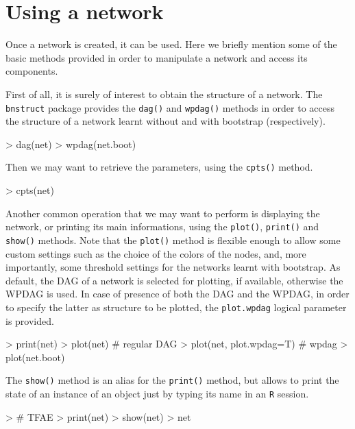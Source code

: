 \documentclass{article}
\newcommand{\Rpackage}[1]{{\texttt{#1}}}
\newcommand{\Rmethod}[1]{{\texttt{#1}}}
\newcommand{\Rfunarg}[1]{{\texttt{#1}}}
\begin{document}
\section{Using a network}
Once a network is created, it can be used. Here we briefly mention some of the basic methods provided in order to
manipulate a network and access its components.

First of all, it is surely of interest to obtain the structure of a network. The \Rpackage{bnstruct} package
provides the \Rmethod{dag()} and \Rmethod{wpdag()} methods in order to access the structure of a network learnt without and
with bootstrap (respectively).
\begin{Schunk}
\begin{Sinput}
> dag(net)
> wpdag(net.boot)
\end{Sinput}
\end{Schunk}

Then we may want to retrieve the parameters, using the \Rmethod{cpts()} method.
\begin{Schunk}
\begin{Sinput}
> cpts(net)
\end{Sinput}
\end{Schunk}

Another common operation that we may want to perform is displaying the network, or printing its main informations, using the
\Rmethod{plot()}, \Rmethod{print()} and \Rmethod{show()} methods. Note that the \Rmethod{plot()} method is flexible enough to allow 
some custom settings such as the choice of the colors of the nodes, and, more importantly, some threshold settings 
for the networks learnt with bootstrap. As default, the DAG of a network is selected for plotting, if available,
otherwise the WPDAG is used. In case of presence of both the DAG and the WPDAG, in order to specify the latter as
structure to be plotted, the \Rfunarg{plot.wpdag} logical parameter is provided.
\begin{Schunk}
\begin{Sinput}
> print(net)
> plot(net) # regular DAG
> plot(net, plot.wpdag=T) # wpdag
> plot(net.boot)
\end{Sinput}
\end{Schunk}

The \Rmethod{show()} method is an alias for the \Rmethod{print()} method, but allows to print the state of an instance of an object
just by typing its name in an \texttt{R} session.
\begin{Schunk}
\begin{Sinput}
> # TFAE
> print(net)
> show(net)
> net
\end{Sinput}
\end{Schunk}
\end{document}
